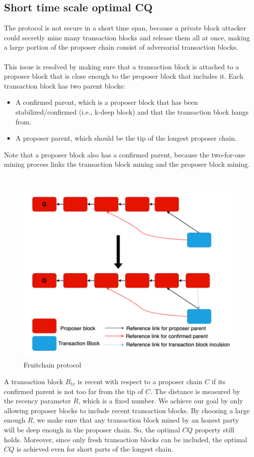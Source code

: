 \subsection{Short time scale optimal CQ}
The protocol is not secure in a short time span, because a private block attacker could secretly mine many transaction blocks and release them all at once, making a large portion of the proposer chain consist of adversarial transaction blocks.\\\\
This issue is resolved by making sure that a transaction block is attached to a proposer block that is close enough to the proposer block that includes it. Each transaction block has two parent blocks:
\begin{itemize}
    \item A confirmed parent, which is a proposer block that has been stabilized/confirmed (i.e., k-deep block) and that the transaction block hangs from.
    \item A proposer parent, which should be the tip of the longest proposer chain.
\end{itemize}
Note that a proposer block also has a confirmed parent, because the two-for-one mining process links the transaction block mining and the proposer block mining.\\\\
\begin{figure}[h!]
    \centering
    \includegraphics[width=0.6\linewidth]{Fig/07/F6}
    \caption{Fruitchain protocol}
    \label{fig:f6}
\end{figure}
A transaction block $B_{tx}$ is recent with respect to a proposer chain $C$ if its confirmed parent is not too far from the tip of $C$. The distance is measured by the recency parameter $R$, which is a fixed number. We achieve our goal by only allowing proposer blocks to include recent transaction blocks. By choosing a large enough $R$, we make sure that any transaction block mined by an honest party will be deep enough in the proposer chain. So, the optimal $CQ$ property still holds. Moreover, since only fresh transaction blocks can be included, the optimal $CQ$ is achieved even for short parts of the longest chain.
